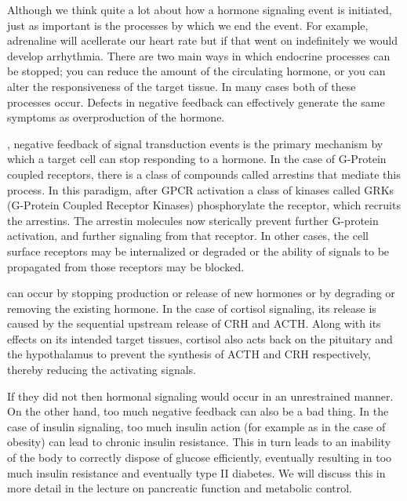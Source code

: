 \documentclass{tufte-handout}
\begin{document}
Although we think quite a lot about how a hormone signaling event is initiated, just as important is the processes by which we end the event.  For example, adrenaline will acellerate our heart rate but if that went on indefinitely we would develop arrhythmia.  There are two main ways in which endocrine processes can be stopped;  you can reduce the amount of the circulating hormone, or you can alter the responsiveness of the target tissue.  In many cases both of these processes occur.  Defects in negative feedback can effectively generate the same symptoms as overproduction of the hormone.

, negative feedback of signal transduction events is the primary mechanism by which a target cell can stop responding to a hormone.  In the case of G-Protein coupled receptors, there is a class of compounds called arrestins that mediate this process.  In this paradigm, after GPCR activation a class of kinases called GRKs (G-Protein Coupled Receptor Kinases) phosphorylate the receptor, which recruits the arrestins.  The arrestin molecules now sterically prevent further G-protein activation, and further signaling from that receptor.  In other cases, the cell surface receptors may be internalized or degraded or the ability of signals to be propagated from those receptors may be blocked.

 can occur by stopping production or release of new hormones or by degrading or removing the existing hormone.  In the case of cortisol signaling, its release is caused by the sequential upstream release of CRH and ACTH.  Along with its effects on its intended target tissues, cortisol also acts back on the pituitary and the hypothalamus to prevent the synthesis of ACTH and CRH respectively, thereby reducing the activating signals.  

  If they did not then hormonal signaling would occur in an unrestrained manner.  On the other hand, too much negative feedback can also be a bad thing.  In the case of insulin signaling, too much insulin action (for example as in the case of obesity) can lead to chronic insulin resistance.  This in turn leads to an inability of the body to correctly dispose of glucose efficiently, eventually resulting in too much insulin resistance and eventually type II diabetes.  We will discuss this in more detail in the lecture on pancreatic function and metabolic control.
\end{document}
